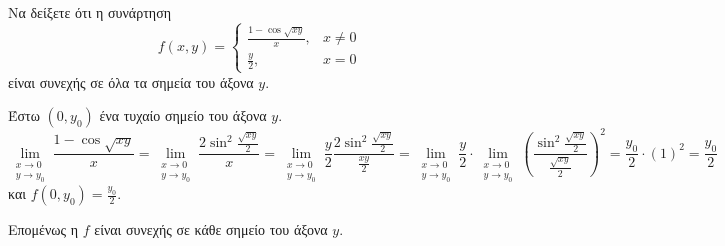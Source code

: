 \documentclass[a4paper,11pt]{report}
\begin{document}
\begin{example}
  Να δείξετε ότι η συνάρτηση 
  \[
    f(x,y) = 
    \begin{cases} 
      \frac{1 - \cos{\sqrt{xy}}}{x}, & x \neq 0 \\
      \frac{y}{2}, & x=0 
    \end{cases} 
  \] 
  είναι συνεχής σε όλα τα σημεία του άξονα $y$.
  \begin{solution}
  \item {}
    Έστω $ (0, y_{0}) $ ένα τυχαίο σημείο 
    του άξονα $y$. 
    \[
      \lim\limits_{\substack{x\to 0 \\y \to y_0}} 
      \frac{1 - \cos{\sqrt{xy}}}{x} = 
      \lim\limits_{\substack{x\to 0 \\y \to y_0}} \frac{2
      \sin^{2}{\frac{\sqrt{xy}}{2}}}{x} = \lim\limits_{\substack{x\to 0 \\y
    \to y_0}} \frac{y}{2} 
    \frac{2\sin^{2}{\frac{\sqrt{xy}}{2}}}{\frac{xy}{2}} =
    \lim\limits_{\substack{x\to 0 \\y \to y_0}} \frac{y}{2} \cdot
    \lim\limits_{\substack{x\to 0 \\y \to y_0}} 
    \left(\frac{\sin^{2}{\frac{\sqrt{xy} }{2}
    }}{\frac{\sqrt{xy}}{2}} \right)^{2} = \frac{y_0}{2} \cdot (1)^{2} =
    \frac{y_{0}}{2} 
  \] 
  και 
  $ f(0, y_{0}) = \frac{y_{0}}{2} $.

  Επομένως η $f$ είναι συνεχής σε κάθε σημείο του άξονα $y$.
\end{solution}
\end{example}
\end{document}
